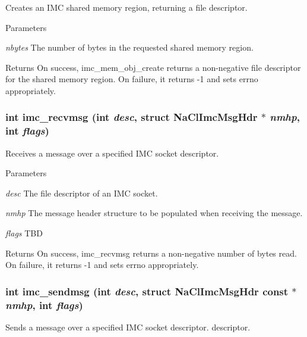 \label{group__syscalls_ga182a6da37d09ec51dcd181dd5a393fba}
Creates an IMC shared memory region, returning a file descriptor. 
\begin{DoxyParams}{Parameters}
\item[{\em nbytes}]The number of bytes in the requested shared memory region. \end{DoxyParams}
\begin{DoxyReturn}{Returns}
On success, imc\_\-mem\_\-obj\_\-create returns a non-\/negative file descriptor for the shared memory region. On failure, it returns -\/1 and sets errno appropriately. 
\end{DoxyReturn}
\hypertarget{group__syscalls_gac935e49fda12e4f012fcb9eea3475f5c}{
\subsubsection[{imc\_\-recvmsg}]{\setlength{\rightskip}{0pt plus 5cm}int imc\_\-recvmsg (int {\em desc}, \/  struct NaClImcMsgHdr $\ast$ {\em nmhp}, \/  int {\em flags})}}
\label{group__syscalls_gac935e49fda12e4f012fcb9eea3475f5c}
Receives a message over a specified IMC socket descriptor. 
\begin{DoxyParams}{Parameters}
\item[{\em desc}]The file descriptor of an IMC socket. \item[{\em nmhp}]The message header structure to be populated when receiving the message. \item[{\em flags}]TBD \end{DoxyParams}
\begin{DoxyReturn}{Returns}
On success, imc\_\-recvmsg returns a non-\/negative number of bytes read. On failure, it returns -\/1 and sets errno appropriately. 
\end{DoxyReturn}
\hypertarget{group__syscalls_gaeebbaffd8770c75e4cd8648621dc2e77}{
\subsubsection[{imc\_\-sendmsg}]{\setlength{\rightskip}{0pt plus 5cm}int imc\_\-sendmsg (int {\em desc}, \/  struct NaClImcMsgHdr const $\ast$ {\em nmhp}, \/  int {\em flags})}}
\label{group__syscalls_gaeebbaffd8770c75e4cd8648621dc2e77}
Sends a message over a specified IMC socket descriptor. descriptor. 
